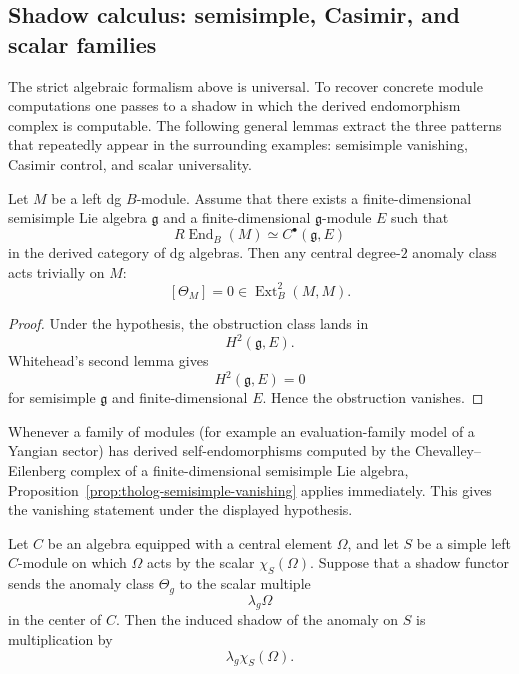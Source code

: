 \subsection{Shadow calculus: semisimple, Casimir, and scalar families}
\label{subsec:tholog-shadow-calculus}

The strict algebraic formalism above is universal.
To recover concrete module computations one passes to a shadow in which the derived endomorphism complex is computable.
The following general lemmas extract the three patterns that repeatedly appear in the surrounding examples: semisimple vanishing, Casimir control, and scalar universality.

\begin{proposition}
\label{prop:tholog-semisimple-vanishing}
Let \(M\) be a left dg \(B\)-module.
Assume that there exists a finite-dimensional semisimple Lie algebra \(\mathfrak{g}\) and a finite-dimensional \(\mathfrak{g}\)-module \(E\) such that
\[
R\!\operatorname{End}_{B}(M)\simeq C^{\bullet}(\mathfrak{g},E)
\]
in the derived category of dg algebras.
Then any central degree-\(2\) anomaly class acts trivially on \(M\):
\[
[\Theta_{M}]=0\in \operatorname{Ext}^{2}_{B}(M,M).
\]
\end{proposition}

\begin{proof}
Under the hypothesis, the obstruction class lands in
\[
H^{2}(\mathfrak{g},E).
\]
Whitehead's second lemma gives
\[
H^{2}(\mathfrak{g},E)=0
\]
for semisimple \(\mathfrak{g}\) and finite-dimensional \(E\).
Hence the obstruction vanishes.
\end{proof}

\begin{remark}
\label{rem:tholog-evaluation-family-shadow}
Whenever a family of modules (for example an evaluation-family model of a Yangian sector) has derived self-endomorphisms computed by the Chevalley--Eilenberg complex of a finite-dimensional semisimple Lie algebra, Proposition~\ref{prop:tholog-semisimple-vanishing} applies immediately.
This gives the vanishing statement under the displayed hypothesis.
\end{remark}

\begin{proposition}
\label{prop:tholog-casimir-shadow}
Let \(C\) be an algebra equipped with a central element \(\Omega\), and let \(S\) be a simple left \(C\)-module on which \(\Omega\) acts by the scalar \(\chi_{S}(\Omega)\).
Suppose that a shadow functor sends the anomaly class \(\Theta_{g}\) to the scalar multiple
\[
\lambda_{g}\Omega
\]
in the center of \(C\).
Then the induced shadow of the anomaly on \(S\) is multiplication by
\[
\lambda_{g}\chi_{S}(\Omega).
\]
\end{proposition}

